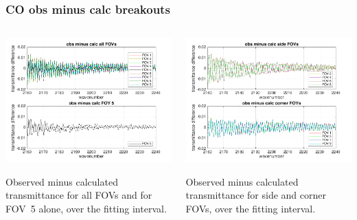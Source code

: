 \documentclass[10pt]{beamer}
\begin{document}
\begin{frame}
\frametitle{CO obs minus calc breakouts}
\begin{columns}[t]
\begin{column}{0.5\textwidth}
  \begin{centering}
  \includegraphics[width=\textwidth]{figures/CO_breakout_1.png}
  \end{centering}\vspace{3mm}

Observed minus calculated transmittance for all FOVs and for FOV~5
alone, over the fitting interval.

\end{column}
\begin{column}{0.5\textwidth}  
  \begin{centering}
  \includegraphics[width=\textwidth]{figures/CO_breakout_2.png}
  \end{centering}\vspace{3mm}

Observed minus calculated transmittance for side and corner FOVs,
over the fitting interval.

\end{column}
\end{columns}
\end{frame}
\end{document}
